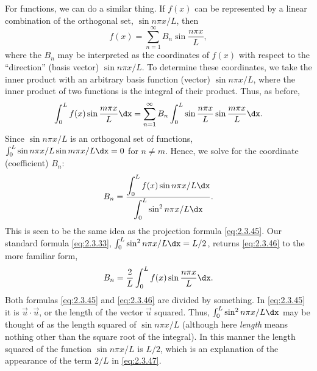 For functions, we can do a similar thing. If $f(x)$ can be represented by a linear combination of the orthogonal set, $\sin n\pi x/L$, then
\[
f(x) = \sum_{n=1}^{\infty} B_n \sin\frac{n\pi x}{L},
\]
where the $B_n$ may be interpreted as the coordinates of $f(x)$ with respect to the ``direction'' (basis vector) $\sin n\pi x/L$. To determine these coordinates, we take the inner product with an arbitrary basis function (vector) $\sin n\pi x/L$, where the inner product of two functions is the integral of their product. Thus, as before,
\[
\int_0^L f(x)\sin\frac{m\pi x}{L}\dx = \sum_{n=1}^{\infty} B_n \int_0^L \sin\frac{n\pi x}{L}\sin\frac{m\pi x}{L}\dx.
\]
Since $\sin n\pi x/L$ is an orthogonal set of functions, $\int_0^L \sin n\pi x/L\sin m\pi x/L\dx = 0$ for $n \ne m$. Hence, we solve for the coordinate (coefficient) $B_n$:
\begin{equation}
\label{eq:2.3.46}
B_n = \frac{\displaystyle\int_0^L f(x)\sin n\pi x/L\dx}{\displaystyle\int_0^L \sin^2 n\pi x/L\dx}.
\end{equation}
This is seen to be the same idea as the projection formula \eqref{eq:2.3.45}. Our standard formula \eqref{eq:2.3.33}, $\int_0^L \sin^2 n\pi x/L\dx = L/2$, returns \eqref{eq:2.3.46} to the more familiar form,
\begin{equation}
\label{eq:2.3.47}
B_n = \frac{2}{L}\int_0^L f(x)\sin\frac{n\pi x}{L}\dx.
\end{equation}
Both formulas \eqref{eq:2.3.45} and \eqref{eq:2.3.46} are divided by something. In \eqref{eq:2.3.45} it is $\vec{u}\cdot\vec{u}$, or the length of the vector $\vec{u}$ squared. Thus, $\int_0^L \sin^2 n\pi x/L\dx$ may be thought of as the length squared of $\sin n\pi x/L$ (although here \emph{length} means nothing other than the square root of the integral). In this manner the length squared of the function $\sin n\pi x/L$ is $L/2$, which is an explanation of the appearance of the term $2/L$ in \eqref{eq:2.3.47}.

